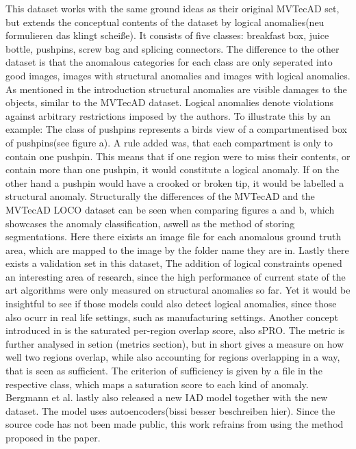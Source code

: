 This dataset works with the same ground ideas as their original MVTecAD set, but extends the conceptual contents of the dataset by logical anomalies(neu formulieren das klingt scheiße). 
It consists of five classes: breakfast box, juice bottle, pushpins, screw bag and splicing connectors. The difference to the other dataset is that the anomalous categories for each class are only seperated into good images, images with structural anomalies 
and images with logical anomalies. As mentioned in the introduction structural anomalies are visible damages to the objects, similar to the MVTecAD dataset. Logical anomalies denote violations against arbitrary restrictions 
imposed by the authors. To illustrate this by an example: The class of pushpins represents a birds view of a compartmentised box of pushpins(see figure a). A rule added was, 
that each compartment is only to contain one pushpin. This means that if one region were to miss their contents, or contain more than one pushpin, it would constitute a logical anomaly. If on the 
other hand a pushpin would have a crooked or broken tip, it would be  labelled a structural anomaly. Structurally the differences of the 
MVTecAD and the MVTecAD LOCO dataset can be seen when comparing figures a and b, which showcases the anomaly classification, aswell as 
the method of storing segmentations. Here there eixists an image file for each anomalous ground truth area, which are mapped to the image 
by the folder name they are in. Lastly there exists a validation set in this dataset,
\newline
The addition of logical constraints opened an interesting area of research, since the high performance 
of current state of the art algorithms were only measured on structural anomalies so far. Yet it would be insightful to see if those models could also detect logical anomalies, since those also ocurr 
in real life settings, such as manufacturing settings. Another concept introduced in \cite{LOCODentsAndScratchesBergmann2022} is the 
saturated per-region overlap score, also sPRO. The metric is further analysed in setion (metrics section), but in short gives a measure 
on how well two regions overlap, while also accounting for regions overlapping in a way, that is seen as sufficient. The criterion of 
sufficiency is given by a file in the respective class, which maps a saturation score to each kind of anomaly.
Bergmann et al.\cite{LOCODentsAndScratchesBergmann2022} lastly also released a new IAD model together with the new dataset. The model uses autoencoders(bissi besser beschreiben hier). Since the source code has not been made public, 
this work refrains from using the method proposed in the paper.




